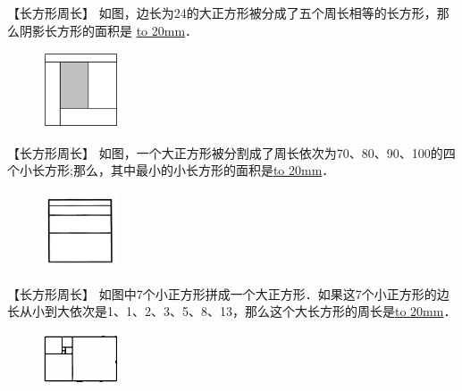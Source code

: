 \item {
    【长方形周长】
    如图，边长为24的大正方形被分成了五个周长相等的长方形，那么阴影长方形的面积是 \underline{\hbox to 20mm{}}．
    \begin{figure}[H] 
        \centering
        \includegraphics[width=0.2\textwidth]{./pics/Chapter_3/2.png}
    \end{figure}
    \vspace{1cm}
}
\item {
    【长方形周长】
    如图，一个大正方形被分割成了周长依次为70、80、90、100的四个小长方形;那么，其中最小的小长方形的面积是\underline{\hbox to 20mm{}}．
    \begin{figure}[H] 
        \centering
        \includegraphics[width=0.2\textwidth]{./pics/Chapter_3/4.png}
    \end{figure}
    \vspace{1cm}
}

\item {
    【长方形周长】
    如图中7个小正方形拼成一个大正方形．如果这7个小正方形的边长从小到大依次是1、1、2、3、5、8、13，那么这个大长方形的周长是\underline{\hbox to 20mm{}}．
    \begin{figure}[H] 
        \centering
        \includegraphics[width=0.2\textwidth]{./pics/Chapter_3/20.png}
    \end{figure}
    \vspace{1cm}
}

